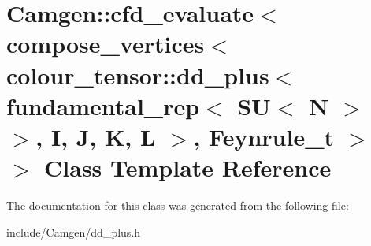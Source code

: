 \hypertarget{a00061}{\section{Camgen\-:\-:cfd\-\_\-evaluate$<$ compose\-\_\-vertices$<$ colour\-\_\-tensor\-:\-:dd\-\_\-plus$<$ fundamental\-\_\-rep$<$ S\-U$<$ N $>$ $>$, I, J, K, L $>$, Feynrule\-\_\-t $>$ $>$ Class Template Reference}
\label{a00061}
}


The documentation for this class was generated from the following file\-:\begin{DoxyCompactItemize}
\item 
include/\-Camgen/dd\-\_\-plus.\-h\end{DoxyCompactItemize}
